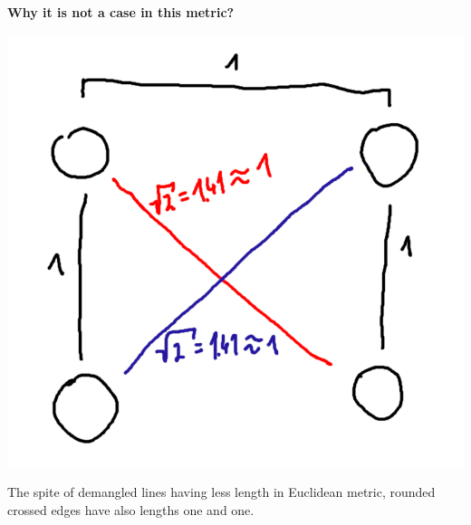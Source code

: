 \documentclass{article}
\begin{document}
    \begin{center}
        \textbf{Why it is not a case in this metric?}
    \end{center}
    \begin{center}
        \includegraphics[scale=0.4]{second} 
    \end{center}
    The spite of demangled lines having less length in Euclidean metric, rounded crossed edges have also lengths one and one.
\end{document}
